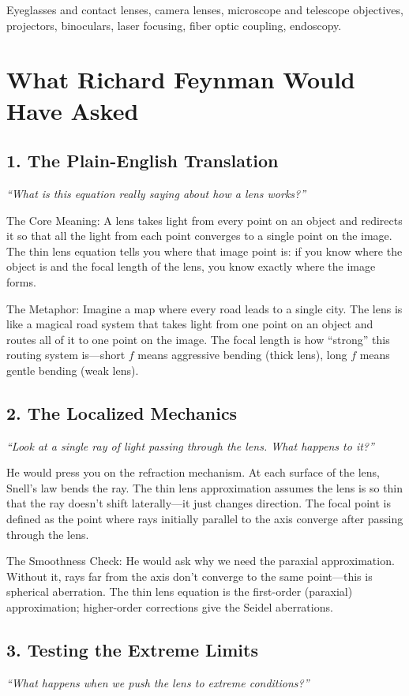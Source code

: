 \documentclass[11pt,openright]{book}
\begin{document}
Eyeglasses and contact lenses, camera lenses, microscope and telescope objectives, projectors, binoculars, laser focusing, fiber optic coupling, endoscopy.
\section*{What Richard Feynman Would Have Asked}

\subsection*{1. The Plain-English Translation}
\textit{``What is this equation really saying about how a lens works?''}

The Core Meaning: A lens takes light from every point on an object and redirects it so that all the light from each point converges to a single point on the image. The thin lens equation tells you where that image point is: if you know where the object is and the focal length of the lens, you know exactly where the image forms.

The Metaphor: Imagine a map where every road leads to a single city. The lens is like a magical road system that takes light from one point on an object and routes all of it to one point on the image. The focal length is how ``strong'' this routing system is---short $f$ means aggressive bending (thick lens), long $f$ means gentle bending (weak lens).

\subsection*{2. The Localized Mechanics}
\textit{``Look at a single ray of light passing through the lens. What happens to it?''}

He would press you on the refraction mechanism. At each surface of the lens, Snell's law bends the ray. The thin lens approximation assumes the lens is so thin that the ray doesn't shift laterally---it just changes direction. The focal point is defined as the point where rays initially parallel to the axis converge after passing through the lens.

The Smoothness Check: He would ask why we need the paraxial approximation. Without it, rays far from the axis don't converge to the same point---this is spherical aberration. The thin lens equation is the first-order (paraxial) approximation; higher-order corrections give the Seidel aberrations.

\subsection*{3. Testing the Extreme Limits}
\textit{``What happens when we push the lens to extreme conditions?''}
\end{document}
